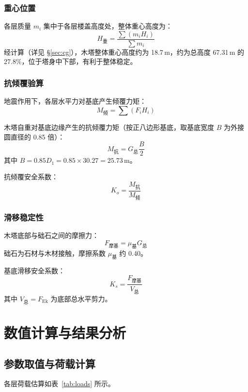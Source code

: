 \documentclass[12pt,a4paper,UTF8]{ctexart}
\begin{document}
\subsubsection{重心位置}

各层质量 $m_i$ 集中于各层楼盖高度处，整体重心高度为：
\[
    H_{\text{重}} = \frac{\sum(m_i H_i)}{\sum m_i}
\]
经计算（详见 §\ref{sec:cg}），木塔整体重心高度约为 18.7\,m，约为总高度 67.31\,m 的 27.8\%，位于塔身中下部，有利于整体稳定。

\subsubsection{抗倾覆验算}

地震作用下，各层水平力对基底产生倾覆力矩：
\[
    M_{\text{倾}} = \sum(F_i H_i)
\]

木塔自重对基底边缘产生的抗倾覆力矩（按正八边形基底，取基底宽度 $B$ 为外接圆直径的 0.85 倍）：
\[
    M_{\text{抗}} = G_{\text{总}} \frac{B}{2}
\]
其中 $B = 0.85 D_1 = 0.85 \times 30.27 = 25.73$\,m。

抗倾覆安全系数：
\[
    K_o = \frac{M_{\text{抗}}}{M_{\text{倾}}}
\]

\subsubsection{滑移稳定性}

木塔底部与础石之间的摩擦力：
\[
    F_{\text{摩基}} = \mu_{\text{基}} G_{\text{总}}
\]
础石为石材与木材接触，摩擦系数 $\mu_{\text{基}}$ 约 0.40。

基底滑移安全系数：
\[
    K_s = \frac{F_{\text{摩基}}}{V_{\text{总}}}
\]
其中 $V_{\text{总}} = F_{\text{Ek}}$ 为底部总水平剪力。

\section{数值计算与结果分析}
\label{sec:results}

\subsection{参数取值与荷载计算}

各层荷载估算如表~\ref{tab:loads} 所示。
\end{document}
